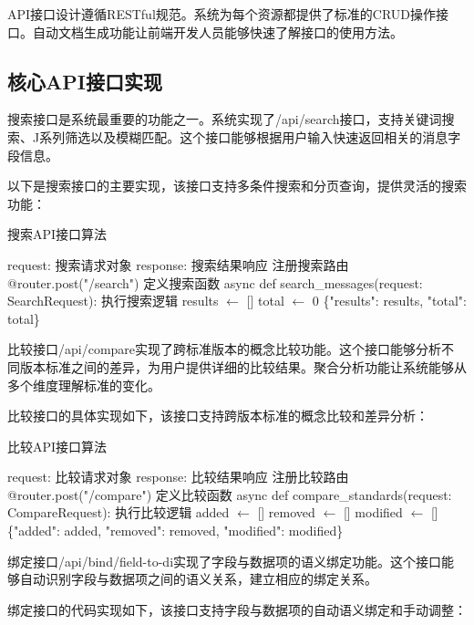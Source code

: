 API接口设计遵循RESTful规范。系统为每个资源都提供了标准的CRUD操作接口。自动文档生成功能让前端开发人员能够快速了解接口的使用方法。



\subsection{核心API接口实现}

搜索接口是系统最重要的功能之一。系统实现了/api/search接口，支持关键词搜索、J系列筛选以及模糊匹配。这个接口能够根据用户输入快速返回相关的消息字段信息。

以下是搜索接口的主要实现，该接口支持多条件搜索和分页查询，提供灵活的搜索功能：

\begin{algorithm}[H]
\caption{搜索API接口算法}
\begin{algorithmic}[1]
\REQUIRE request: 搜索请求对象
\ENSURE response: 搜索结果响应
\STATE 注册搜索路由
\STATE @router.post("/search")
\STATE 定义搜索函数
\STATE async def search\_messages(request: SearchRequest):
\STATE     执行搜索逻辑
\STATE     results $\leftarrow$ []
\STATE     total $\leftarrow$ 0
\STATE     \RETURN \{"results": results, "total": total\}
\end{algorithmic}
\end{algorithm}

比较接口/api/compare实现了跨标准版本的概念比较功能。这个接口能够分析不同版本标准之间的差异，为用户提供详细的比较结果。聚合分析功能让系统能够从多个维度理解标准的变化。

比较接口的具体实现如下，该接口支持跨版本标准的概念比较和差异分析：

\begin{algorithm}[H]
\caption{比较API接口算法}
\begin{algorithmic}[1]
\REQUIRE request: 比较请求对象
\ENSURE response: 比较结果响应
\STATE 注册比较路由
\STATE @router.post("/compare")
\STATE 定义比较函数
\STATE async def compare\_standards(request: CompareRequest):
\STATE     执行比较逻辑
\STATE     added $\leftarrow$ []
\STATE     removed $\leftarrow$ []
\STATE     modified $\leftarrow$ []
\STATE     \RETURN \{"added": added, "removed": removed, "modified": modified\}
\end{algorithmic}
\end{algorithm}

绑定接口/api/bind/field-to-di实现了字段与数据项的语义绑定功能。这个接口能够自动识别字段与数据项之间的语义关系，建立相应的绑定关系。

绑定接口的代码实现如下，该接口支持字段与数据项的自动语义绑定和手动调整：

